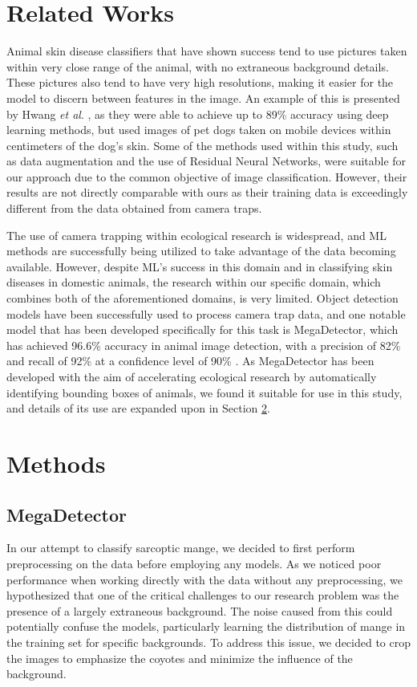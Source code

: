 \documentclass{article}
\begin{document}
\section{Related Works} 
\label{sec:lit review}
Animal skin disease classifiers that have shown success tend to use pictures taken within very close range of the animal, with no extraneous background details. These pictures also tend to have very high resolutions, making it easier for the model to discern between features in the image. An example of this is presented by Hwang \textit{et al}. \cite{Hwang2022}, as they were able to achieve up to 89\% accuracy using deep learning methods, but used images of pet dogs taken on mobile devices within centimeters of the dog’s skin. Some of the methods used within this study, such as data augmentation and the use of Residual Neural Networks, were suitable for our approach due to the common objective of image classification. 
However, their results are not directly comparable with ours as their training data is exceedingly different from the data obtained from camera traps.

The use of camera trapping within ecological research is widespread, and ML methods are successfully being utilized to take advantage of the data becoming available. However, despite ML's success in this domain and in classifying skin diseases in domestic animals, the research within our specific domain, which combines both of the aforementioned domains, is very limited. 
Object detection models have been successfully used to process camera trap data, and one notable model that has been developed specifically for this task is MegaDetector, which has achieved 96.6\% accuracy in animal image detection, with a precision of 82\% and recall of 92\% at a confidence level of 90\% \cite{Fennell2022}. As MegaDetector has been developed with the aim of accelerating ecological research by automatically identifying bounding boxes of animals, we found it suitable for use in this study, and details of its use are expanded upon in Section \ref{sec:methods}.

\section{Methods} \label{sec:methods}

\subsection{MegaDetector}
In our attempt to classify sarcoptic mange, we decided to first perform preprocessing on the data before employing any models. As we noticed poor performance when working directly with the data without any preprocessing, we hypothesized that one of the critical challenges to our research problem was the presence of a largely extraneous background. The noise caused from this could potentially confuse the models, particularly learning the distribution of mange in the training set for specific backgrounds. To address this issue, we decided to crop the images to emphasize the coyotes and minimize the influence of the background.
\end{document}
